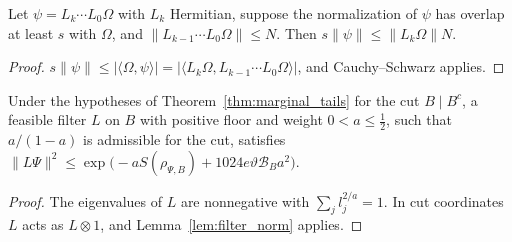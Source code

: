 \begin{lemma}
    \label{lem:prefix_step}
    \leanok
    Let $\psi=L_k\cdots L_0\Omega$ with $L_k$ Hermitian, suppose the normalization of $\psi$
    has overlap at least $s$ with $\Omega$, and $\lVert L_{k-1}\cdots L_0\Omega\rVert\le N$.
    Then $s\lVert\psi\rVert\le\lVert L_k\Omega\rVert N$.
\end{lemma}
\begin{proof}\leanok
    $s\lVert\psi\rVert\le\lvert\langle\Omega,\psi\rangle\rvert
        =\lvert\langle L_k\Omega,L_{k-1}\cdots L_0\Omega\rangle\rvert$, and Cauchy--Schwarz applies.
\end{proof}

\begin{lemma}
    \label{lem:region_filter_norm}
    \leanok
    Under the hypotheses of Theorem~\ref{thm:marginal_tails} for the cut $B\mid B^c$, a
    feasible filter $L$ on $B$ with positive floor and weight $0<a\le\tfrac12$, such that
    $a/(1-a)$ is admissible for the cut, satisfies
    $\lVert L\Psi\rVert^2\le\exp\bigl(-aS(\rho_{\Psi,B})+1024e\vartheta\mathcal B_Ba^2\bigr)$.
\end{lemma}
\begin{proof}\leanok
    The eigenvalues of $L$ are nonnegative with $\sum_j l_j^{2/a}=1$. In cut coordinates
    $L$ acts as $L\otimes1$, and Lemma~\ref{lem:filter_norm} applies.
\end{proof}

